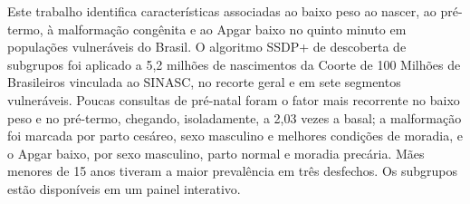 
\begin{abstract}
  This study identifies characteristics associated with low birth weight, preterm birth, congenital anomaly and low 5-minute Apgar in vulnerable Brazilian populations. The SSDP+ subgroup discovery algorithm was applied to 5.2 million births from the 100 Million Brazilian Cohort linked to SINASC, in the overall sample and seven vulnerable segments. Few prenatal visits were the most frequent factor for low birth weight and preterm birth, reaching 2.03 times the baseline on its own; anomaly was marked by cesarean delivery, male sex and better housing, and low Apgar by male sex, vaginal delivery and poor housing. Mothers under 15 had the highest prevalence of three outcomes. The subgroups are available in an interactive dashboard.
\end{abstract}

\begin{resumo}
  Este trabalho identifica características associadas ao baixo peso ao nascer, ao pré-termo, à malformação congênita e ao Apgar baixo no quinto minuto em populações vulneráveis do Brasil. O algoritmo SSDP+ de descoberta de subgrupos foi aplicado a 5,2 milhões de nascimentos da Coorte de 100 Milhões de Brasileiros vinculada ao SINASC, no recorte geral e em sete segmentos vulneráveis. Poucas consultas de pré-natal foram o fator mais recorrente no baixo peso e no pré-termo, chegando, isoladamente, a 2,03 vezes a basal; a malformação foi marcada por parto cesáreo, sexo masculino e melhores condições de moradia, e o Apgar baixo, por sexo masculino, parto normal e moradia precária. Mães menores de 15 anos tiveram a maior prevalência em três desfechos. Os subgrupos estão disponíveis em um painel interativo.
\end{resumo}
